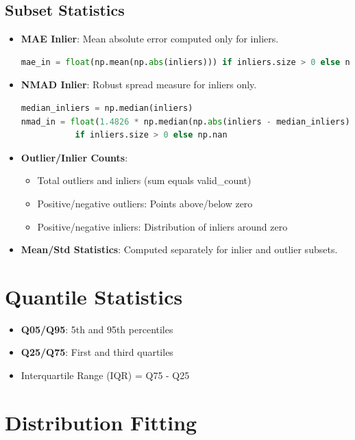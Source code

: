\documentclass[12pt]{article}
\begin{document}
\subsection{Subset Statistics}
\begin{itemize}
    \item \textbf{MAE Inlier}: Mean absolute error computed only for inliers.
    \begin{lstlisting}[language=Python]
mae_in = float(np.mean(np.abs(inliers))) if inliers.size > 0 else np.nan
    \end{lstlisting}

    \item \textbf{NMAD Inlier}: Robust spread measure for inliers only.
    \begin{lstlisting}[language=Python]
median_inliers = np.median(inliers)
nmad_in = float(1.4826 * np.median(np.abs(inliers - median_inliers))) \
           if inliers.size > 0 else np.nan
    \end{lstlisting}

    \item \textbf{Outlier/Inlier Counts}: 
    \begin{itemize}
        \item Total outliers and inliers (sum equals valid\_count)
        \item Positive/negative outliers: Points above/below zero
        \item Positive/negative inliers: Distribution of inliers around zero
    \end{itemize}

    \item \textbf{Mean/Std Statistics}: Computed separately for inlier and outlier subsets.
\end{itemize}

\section{Quantile Statistics}

\begin{itemize}
    \item \textbf{Q05/Q95}: 5th and 95th percentiles
    \item \textbf{Q25/Q75}: First and third quartiles
    \item Interquartile Range (IQR) = Q75 - Q25
\end{itemize}

\section{Distribution Fitting}
\end{document}
